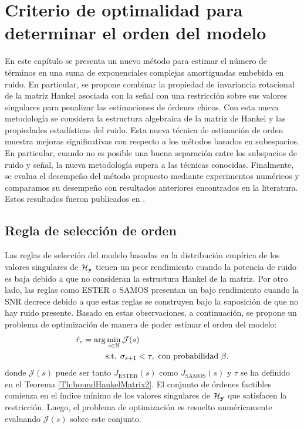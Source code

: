 \chapter{Criterio de optimalidad para determinar el orden del modelo}\label{chap:CriterioOrdenOpt}


    En este capítulo se presenta un nuevo método para estimar el número de términos en una suma de exponenciales complejas amortiguadas embebida en ruido. En particular, se propone combinar la propiedad de invariancia rotacional de la matriz Hankel asociada con la señal con una restricción sobre sus valores singulares para penalizar las estimaciones de órdenes chicos. Con esta nueva metodología se considera la estructura algebraica de la matriz de Hankel y las propiedades estadísticas del ruido. Esta nueva técnica de estimación de orden muestra mejoras significativas con respecto a los métodos basados en subespacios. En particular, cuando no es posible una buena separación entre los subspacios de ruido y señal, la nueva metodología supera a las técnicas conocidas. Finalmente, se evalua el desempeño del método propuesto mediante experimentos numéricos y comparamos su desempeño con resultados anteriores encontrados en la literatura. Estos resultados fueron publicados en \cite{ALBERT2023}.

\section{Regla de selección de orden}\label{sec:SelectionRule}

Las reglas de selección del modelo basadas en la distribución empírica de los valores singulares de $\mathcal{H}_{\mathbf{y}}$ tienen un peor rendimiento cuando la potencia de ruido es baja debido a que no consideran la estructura Hankel de la matriz. Por otro lado, las reglas como ESTER o SAMOS presentan un bajo rendimiento cuando la SNR decrece debido a que estas reglas se construyen bajo la suposición de que no hay ruido presente. Basado en estas observaciones, a continuación, se propone un problema de optimización de manera de poder estimar el orden del modelo:
\begin{equation}
	\begin{aligned}
		\hat{r}_{c} = \arg  & \min_{s\in \mathbb{N}} \mathcal{J}(s)\\
		& \text{s.t. }  \sigma_{s+1}<\tau,\text{ con probabilidad } \beta.
	\end{aligned}
	\label{eq:propuesta3}
\end{equation}
donde $\mathcal{J}(s)$ puede ser tanto $J_{\mathrm{ESTER}}(s)$ como $J_{\mathrm{SAMOS}}(s)$ y $\tau$ se ha definido en el Teorema \ref{Th:boundHankelMatrix2}. El conjunto de órdenes factibles comienza en el índice mínimo de los valores singulares de $\mathcal{H}_{\mathbf{y}}$ que satisfacen la restricción. Luego, el problema de optimización es resuelto numéricamente evaluando $\mathcal{J}(s)$ sobre este conjunto. 


